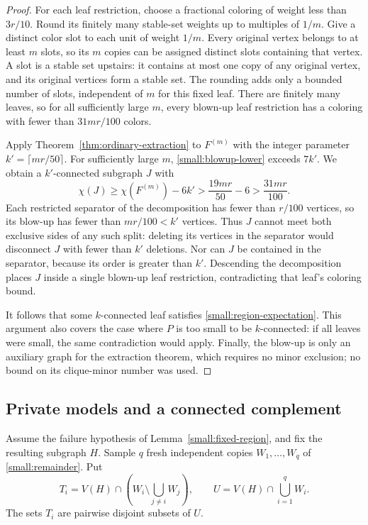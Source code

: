\begin{proof}
For each leaf restriction, choose a fractional coloring of weight less
than $3r/10$. Round its finitely many stable-set weights up to multiples
of $1/m$. Give a distinct color slot to each unit of weight $1/m$.
Every original vertex belongs to at least $m$ slots, so its $m$ copies
can be assigned distinct slots containing that vertex. A slot is a
stable set upstairs: it contains at most one copy of any original
vertex, and its original vertices form a stable set. The rounding adds
only a bounded number of slots, independent of $m$ for this fixed leaf.
There are finitely many leaves, so for all sufficiently large $m$, every
blown-up leaf restriction has a coloring with fewer than $31mr/100$
colors.

Apply Theorem~\ref{thm:ordinary-extraction} to $F^{(m)}$ with the integer
parameter $k'=\lceil mr/50\rceil$. For sufficiently large $m$,
\eqref{small:blowup-lower} exceeds $7k'$. We obtain a $k'$-connected
subgraph $J$ with
\[
 \chi(J)\ge\chi(F^{(m)})-6k'
 >\frac{19mr}{50}-6
 >\frac{31mr}{100}.
\]
Each restricted separator of the decomposition has fewer than $r/100$
vertices, so its blow-up has fewer than $mr/100<k'$ vertices. Thus $J$
cannot meet both exclusive sides of any such split: deleting its
vertices in the separator would disconnect $J$ with fewer than $k'$
deletions. Nor can $J$ be contained in the separator, because its order
is greater than $k'$. Descending the decomposition places $J$ inside a
single blown-up leaf restriction, contradicting that leaf's coloring
bound.

It follows that some $k$-connected leaf satisfies
\eqref{small:region-expectation}. This argument also covers the case
where $P$ is too small to be $k$-connected: if all leaves were small, the
same contradiction would apply. Finally, the blow-up is only an
auxiliary graph for the extraction theorem, which requires no minor
exclusion; no bound on its clique-minor number was used.
\end{proof}

\subsection{Private models and a connected complement}

Assume the failure hypothesis of Lemma~\ref{small:fixed-region}, and fix
the resulting subgraph $H$. Sample $q$ fresh independent copies
$W_1,\ldots,W_q$ of \eqref{small:remainder}. Put
\[
 T_i=V(H)\cap\left(W_i\setminus\bigcup_{j\ne i}W_j\right),
 \qquad
 U=V(H)\cap\bigcup_{i=1}^qW_i.
\]
The sets $T_i$ are pairwise disjoint subsets of $U$.

